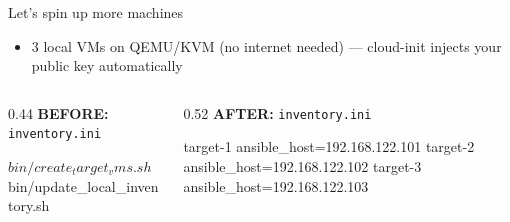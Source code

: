 \documentclass[aspectratio=169,12pt]{beamer}
\begin{document}
\begin{frame}[fragile]{Let's spin up more machines}
\begin{itemize}
  \item 3 local VMs on QEMU/KVM (no internet needed) --- cloud-init injects your public key automatically
\end{itemize}
\vspace{0.15cm}
\begin{columns}[T]
\begin{column}{0.44\textwidth}
\textbf{BEFORE:} \texttt{inventory.ini}
\vspace{0.1cm}
\begin{codeinismall}
[servers]
\end{codeinismall}
\vspace{0.15cm}
\begin{codebashsmall}
$ bin/create_target_vms.sh
$ bin/update_local_inventory.sh
\end{codebashsmall}
\end{column}
\begin{column}{0.52\textwidth}
\textbf{AFTER:} \texttt{inventory.ini}
\vspace{0.1cm}
\begin{codeinismall}
[servers]
target-1 ansible_host=192.168.122.101
target-2 ansible_host=192.168.122.102
target-3 ansible_host=192.168.122.103
\end{codeinismall}
\end{column}
\end{columns}
\end{frame}
\end{document}

